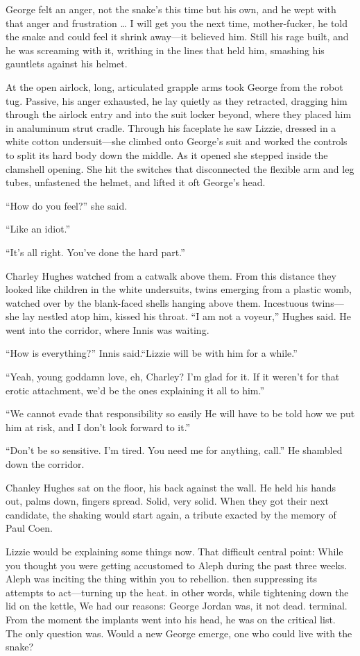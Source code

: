 George felt an anger, not the snake’s this time but his own, and he wept with that anger and frustration … I will get you the next time, mother-fucker, he told the snake and could feel it shrink away—it believed him. Still his rage built, and he was screaming with it, writhing in the lines that held him, smashing his gauntlets against his helmet.

At the open airlock, long, articulated grapple arms took George from the robot tug. Passive, his anger exhausted, he lay quietly as they retracted, dragging him through the airlock entry and into the suit locker beyond, where they placed him in analuminum strut cradle. Through his faceplate he saw Lizzie, dressed in a white cotton undersuit—she climbed onto George’s suit and worked the controls to split its hard body down the middle. As it opened she stepped inside the clamshell opening. She hit the switches that disconnected the flexible arm and leg tubes, unfastened the helmet, and lifted it oft George’s head.

“How do you feel?” she said.

“Like an idiot.”

“It’s all right. You’ve done the hard part.”

Charley Hughes watched from a catwalk above them. From this distance they looked like children in the white undersuits, twins emerging from a plastic womb, watched over by the blank-faced shells hanging above them. Incestuous twins—she lay nestled atop him, kissed his throat. “I am not a voyeur,” Hughes said. He went into the corridor, where Innis was waiting.

“How is everything?” Innis said.“Lizzie will be with him for a while.”

“Yeah, young goddamn love, eh, Charley? I’m glad for it. If it weren’t for that erotic attachment, we’d be the ones explaining it all to him.”

“We cannot evade that responsibility so easily He will have to be told how we put him at risk, and I don’t look forward to it.”

“Don’t be so sensitive. I’m tired. You need me for anything, call.” He shambled down the corridor.

Chanley Hughes sat on the floor, his back against the wall. He held his hands out, palms down, fingers spread. Solid, very solid. When they got their next candidate, the shaking would start again, a tribute exacted by the 
memory of Paul Coen.

Lizzie would be explaining some things now. That difficult central point: While you thought you were getting accustomed to Aleph during the past three weeks. Aleph was inciting the thing within you to rebellion. then suppressing its attempts to act—turning up the heat. in other words, while tightening down the lid on the kettle, We had our reasons: George Jordan was, it not dead. terminal. From the moment the implants went into his head, he was on the critical list. The only question was. Would a new George emerge, one who could live with the snake?

